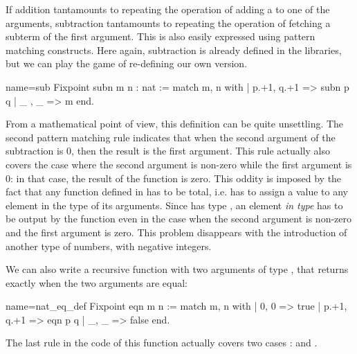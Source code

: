 %
%
If addition tantamounts to repeating the operation of adding a 
to one of the arguments, subtraction tantamounts to repeating the
operation of fetching a subterm of the first argument.  This is also
easily expressed using pattern matching constructs.  Here again,
subtraction is already defined in the libraries, but we can play the game
of re-defining our own version.

\begin{coq}{name=sub}{}
Fixpoint subn m n : nat :=
  match m, n with
  | p.+1, q.+1 => subn p q
  | _ , _ => m
  end.
\end{coq}
From a mathematical point of view, this definition can be quite
unsettling.  The second pattern matching rule indicates that when
the second argument of the subtraction is 0, then the result is
the first argument.  This rule actually also covers the case where the
second argument is non-zero while the first argument is 0: in that
case, the result of the function is zero. This oddity is imposed by
the fact that any function defined in \Coq{} has to be total, i.e. has
to assign a value to any element in the type of its arguments. Since
 has type , an element \emph{in type}  has to be
output by the function even in the case when  the second argument is
non-zero and the first argument is zero. This problem disappears with
the introduction of another type of numbers, with negative integers.


We can also write a recursive function with two arguments of
type , that returns  exactly when the two arguments are
equal:

\begin{coq}{name=nat_eq_def}{}
Fixpoint eqn m n :=
  match m, n with
  | 0, 0 => true
  | p.+1, q.+1 => eqn p q
  | _, _ => false
  end.
\end{coq}
The last rule in the code of this function actually covers two cases :
 and .


